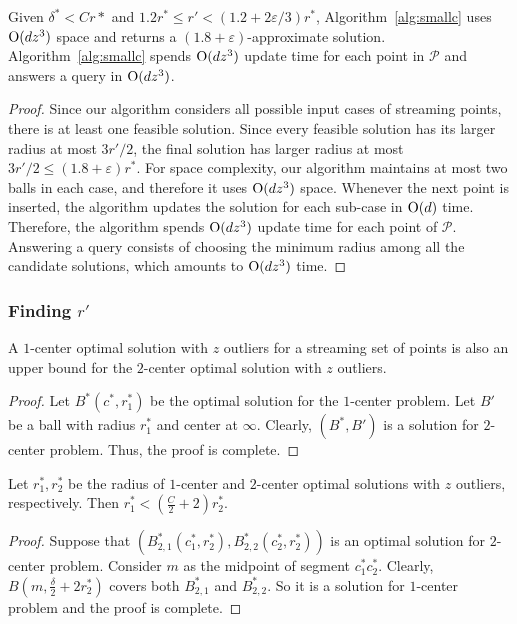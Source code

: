 \documentclass[envcountsame]{cls/cccg15}
\newcommand{\cO}{\ensuremath{{\rm O}}}
\newcommand{\lee}{\leqslant}
\renewcommand{\le}{\lee}
\newcommand{\eps}{\varepsilon}
\begin{document}
\begin{theorem}
Given $\delta^* < C r*$ and $1.2r^* \le r' < (1.2 + 2\eps/3)r^*$, Algorithm~\ref{alg:smallc} uses $\cO (dz^3)$ space and returns a $(1.8+\eps)$-approximate solution. Algorithm~\ref{alg:smallc} spends $\cO (dz^3)$ update time for each point in $\mathcal{P}$ and answers a query in $\cO (dz^3)$.
\end{theorem}

\begin{proof}
Since our algorithm considers all possible input cases of streaming points, there is at least one feasible solution. Since every feasible solution has its larger radius at most $3r'/2$, the final solution has larger radius at most $3r'/2 \le (1.8 + \eps)r^*$.
For space complexity, our algorithm maintains at most two balls in each case, and therefore it uses $\cO(dz^3)$ space. Whenever the next point is inserted, the algorithm updates the solution for each sub-case in $\cO (d)$ time. Therefore, the algorithm spends $\cO (dz^3)$ update time for each point of $\mathcal{P}$. Answering a query consists of choosing the minimum radius among all the candidate solutions, which amounts to $\cO (dz^3)$ time.
\end{proof}


\subsubsection{Finding $r'$}
\label{subsec:findr}

\begin{lemma}
\label{lem:1lt2}
A $1$-center optimal solution with $z$ outliers for a streaming set of points is also an upper bound for the $2$-center optimal solution with $z$ outliers.
\end{lemma}
\begin{proof}
Let $B^*(c^*, r_1^*)$ be the optimal solution for the $1$-center problem. Let $B'$ be a ball with radius $r_1^*$ and center at $\infty$. Clearly, $(B^*, B')$ is a solution for $2$-center problem. Thus, the proof is complete.
\end{proof}

\begin{lemma}
\label{lem:2lt1}
Let $r_1^*, r_2^*$ be the radius of $1$-center and $2$-center optimal solutions with $z$ outliers, respectively. Then $r_1^* < \left(\frac{C}{2} + 2\right) r_2^*$.
\end{lemma}
\begin{proof}
Suppose that $(B_{2, 1}^*(c_1^*, r_2^*), B_{2,2}^*(c_2^*, r_2^*))$ is an optimal solution for $2$-center problem. Consider $m$ as the midpoint of segment 
$c_1^*c_2^*$.
Clearly, $B\left(m, \frac{\delta}{2} + 2r_2^*\right)$ covers both $B_{2, 1}^*$ and $B_{2,2}^*$. So it is a solution for $1$-center problem and the proof is complete.
\end{proof}
\end{document}
